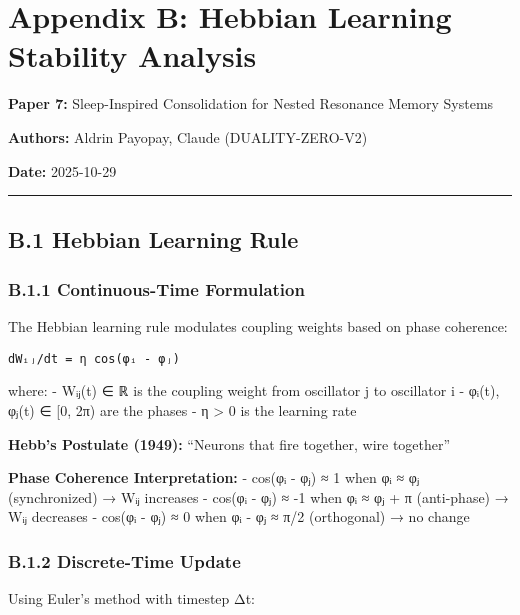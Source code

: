 \documentclass[
]{article}
\author{}
\date{}
\begin{document}
\section{Appendix B: Hebbian Learning Stability
Analysis}\label{appendix-b-hebbian-learning-stability-analysis}

\textbf{Paper 7:} Sleep-Inspired Consolidation for Nested Resonance
Memory Systems

\textbf{Authors:} Aldrin Payopay, Claude (DUALITY-ZERO-V2)

\textbf{Date:} 2025-10-29

\begin{center}\rule{0.5\linewidth}{0.5pt}\end{center}

\subsection{B.1 Hebbian Learning Rule}\label{b.1-hebbian-learning-rule}

\subsubsection{B.1.1 Continuous-Time
Formulation}\label{b.1.1-continuous-time-formulation}

The Hebbian learning rule modulates coupling weights based on phase
coherence:

\begin{verbatim}
dWᵢⱼ/dt = η cos(φᵢ - φⱼ)
\end{verbatim}

where: - Wᵢⱼ(t) ∈ ℝ is the coupling weight from oscillator j to
oscillator i - φᵢ(t), φⱼ(t) ∈ {[}0, 2π) are the phases - η
\textgreater{} 0 is the learning rate

\textbf{Hebb's Postulate (1949):} ``Neurons that fire together, wire
together''

\textbf{Phase Coherence Interpretation:} - cos(φᵢ - φⱼ) ≈ 1 when φᵢ ≈ φⱼ
(synchronized) → Wᵢⱼ increases - cos(φᵢ - φⱼ) ≈ -1 when φᵢ ≈ φⱼ + π
(anti-phase) → Wᵢⱼ decreases - cos(φᵢ - φⱼ) ≈ 0 when \textbar φᵢ -
φⱼ\textbar{} ≈ π/2 (orthogonal) → no change

\subsubsection{B.1.2 Discrete-Time
Update}\label{b.1.2-discrete-time-update}

Using Euler's method with timestep Δt:
\end{document}
